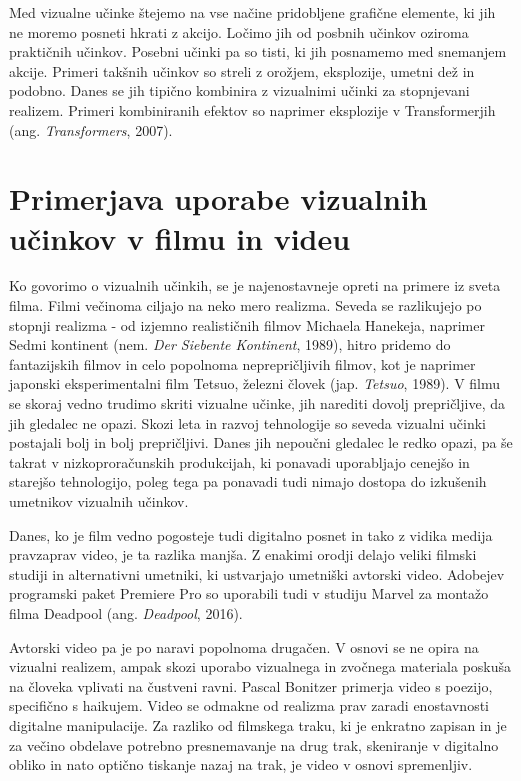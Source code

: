 \documentclass[a4paper, 12pt]{book}
\begin{document}
Med vizualne učinke štejemo na vse načine pridobljene grafične elemente, ki jih ne moremo posneti hkrati z akcijo. 
Ločimo jih od posbnih učinkov oziroma praktičnih učinkov.
Posebni učinki  pa so tisti, ki jih posnamemo med snemanjem akcije.
Primeri takšnih učinkov so streli z orožjem, eksplozije, umetni dež in podobno.
Danes se jih tipično kombinira z vizualnimi učinki za stopnjevani realizem.
Primeri kombiniranih efektov so naprimer eksplozije v Transformerjih (ang. {\it Transformers}, 2007). 

\section{Primerjava uporabe vizualnih učinkov v filmu in videu}

Ko govorimo o vizualnih učinkih, se je najenostavneje opreti na primere iz sveta filma.
Filmi večinoma ciljajo na neko mero realizma.
Seveda se razlikujejo po stopnji realizma - od izjemno realističnih filmov Michaela Hanekeja, naprimer Sedmi kontinent (nem. {\it Der Siebente Kontinent}, 1989), 
hitro pridemo do fantazijskih filmov in celo popolnoma neprepričljivih filmov, kot je naprimer japonski eksperimentalni film Tetsuo, železni človek (jap. {\it Tetsuo}, 1989). 
V filmu se skoraj vedno trudimo skriti vizualne učinke, jih narediti dovolj prepričljive, da jih gledalec ne opazi.
Skozi leta in razvoj tehnologije so seveda vizualni učinki postajali bolj in bolj prepričljivi.
Danes jih nepoučni gledalec le redko opazi, pa še takrat v nizkoproračunskih produkcijah, ki ponavadi uporabljajo cenejšo in starejšo tehnologijo, poleg tega pa ponavadi tudi nimajo dostopa do izkušenih umetnikov vizualnih učinkov.

Danes, ko je film vedno pogosteje tudi digitalno posnet in tako z vidika medija pravzaprav video, je ta razlika manjša.
Z enakimi orodji delajo veliki filmski studiji in alternativni umetniki, ki ustvarjajo umetniški avtorski video.
Adobejev programski paket Premiere Pro so uporabili tudi v studiju Marvel za montažo filma Deadpool (ang. {\it Deadpool}, 2016).


Avtorski video pa je po naravi popolnoma drugačen.
V osnovi se ne opira na vizualni realizem, ampak skozi uporabo vizualnega in zvočnega materiala poskuša na človeka vplivati na čustveni ravni\cite{slepoPolje}.
Pascal Bonitzer primerja video s poezijo, specifično s haikujem.
Video se odmakne od realizma prav zaradi enostavnosti digitalne manipulacije.
Za razliko od filmskega traku, ki je enkratno zapisan in je za večino obdelave potrebno presnemavanje na drug trak, skeniranje v digitalno obliko in nato optično tiskanje nazaj na trak,
je video v osnovi spremenljiv.
\end{document}
